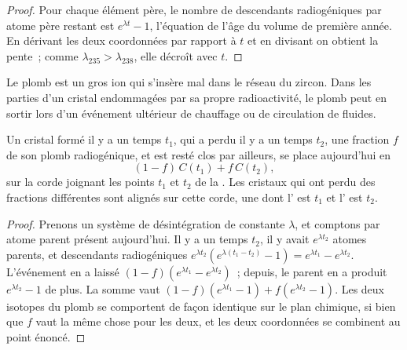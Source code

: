 \begin{proof}
Pour chaque élément père, le nombre de descendants radiogéniques par atome père restant est
$e^{\lambda t} - 1$, l'équation de l'âge du volume de première année. En dérivant
les deux coordonnées par rapport à $t$ et en divisant on obtient la pente~; comme
$\lambda_{235} > \lambda_{238}$, elle décroît avec $t$.
\end{proof}

Le plomb est un gros ion qui s'insère mal dans le réseau du zircon. Dans les parties
d'un cristal endommagées par sa propre radioactivité, le plomb peut en sortir lors
d'un événement ultérieur de chauffage ou de circulation de fluides.

\begin{theorem}\label{thm:b3:advanced-geochronology:discordia}
Un cristal formé il y a un temps $t_1$, qui a perdu il y a un temps $t_2$, une fraction $f$
de son plomb radiogénique, et est resté clos par ailleurs, se place aujourd'hui en
\[
(1 - f)\,C(t_1) + f\,C(t_2),
\]
sur la corde joignant les points $t_1$ et $t_2$ de la . Les cristaux qui
ont perdu des fractions différentes sont alignés sur cette corde, une  dont
l' est $t_1$ et l' est $t_2$.
\end{theorem}

\begin{proof}
Prenons un système de désintégration de constante $\lambda$, et comptons par atome parent
présent aujourd'hui. Il y a un temps $t_2$, il y avait $e^{\lambda t_2}$ atomes parents, et
descendants radiogéniques $e^{\lambda t_2}(e^{\lambda(t_1 - t_2)} - 1) =
e^{\lambda t_1} - e^{\lambda t_2}$. L'événement en a laissé $(1 - f)(e^{\lambda t_1} -
e^{\lambda t_2})$~; depuis, le parent en a produit $e^{\lambda t_2} - 1$ de plus. La
somme vaut $(1 - f)(e^{\lambda t_1} - 1) + f(e^{\lambda t_2} - 1)$. Les deux isotopes
du plomb se comportent de façon identique sur le plan chimique, si bien que $f$ vaut la même chose pour les deux, et
les deux coordonnées se combinent au point énoncé.
\end{proof}

